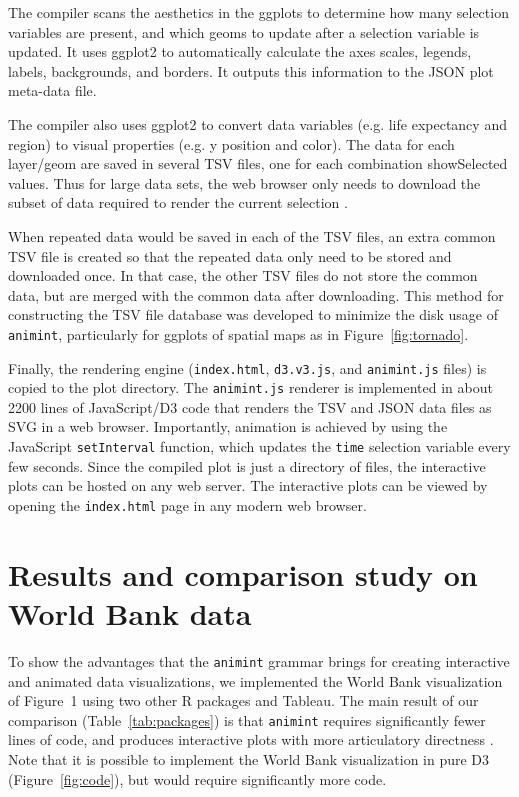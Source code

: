 \documentclass[journal]{vgtc}\usepackage[]{graphicx}\usepackage[]{color}
\begin{document}
The compiler scans the aesthetics in the ggplots to determine
how many selection variables are present, and which geoms to update
after a selection variable is updated. It uses ggplot2 to
automatically calculate the axes scales, legends, labels, backgrounds,
and borders. It outputs this information to the JSON plot meta-data
file.

The compiler also uses ggplot2 to convert data variables (e.g. life
expectancy and region) to visual properties (e.g. y position and
color). The data for each layer/geom are saved in several TSV files,
one for each combination showSelected values. Thus for large data
sets, the web browser only needs to download the subset of data
required to render the current selection \citep{2013-immens}.

When repeated data would be saved in each of the TSV files, an extra
common TSV file is created so that the repeated data only need to be
stored and downloaded once. In that case, the other TSV files do not
store the common data, but are merged with the common data after
downloading. This method for constructing the TSV file database was
developed to minimize the disk usage of \texttt{animint}, particularly
for ggplots of spatial maps as in Figure~\ref{fig:tornado}.

Finally, the rendering engine (\texttt{index.html}, \texttt{d3.v3.js},
and \texttt{animint.js} files) is copied to the plot directory. The
\texttt{animint.js} renderer is implemented in about 2200 lines of
JavaScript/D3 code that renders the TSV and JSON data files as SVG in
a web browser. Importantly, animation is achieved by using the
JavaScript \texttt{setInterval} function, which updates the
\texttt{time} selection variable every few seconds. Since the compiled
plot is just a directory of files, the interactive plots can be hosted
on any web server. The interactive plots can be viewed by opening the
\texttt{index.html} page in any modern web browser.

\section{Results and comparison study on World Bank data}
\label{sec:compare}

To show the advantages that the \texttt{animint} grammar brings for creating
interactive and animated data visualizations, we implemented the World
Bank visualization of Figure~1 using two other R packages and Tableau. The main result of our comparison (Table~\ref{tab:packages}) is that
\texttt{animint} requires significantly fewer lines of code, and produces
interactive plots with more articulatory directness
\citep{Hutchins:1985}. Note that it is possible to implement the World
Bank visualization in pure D3 (Figure~\ref{fig:code}), but would
require significantly more code. %
\end{document}
